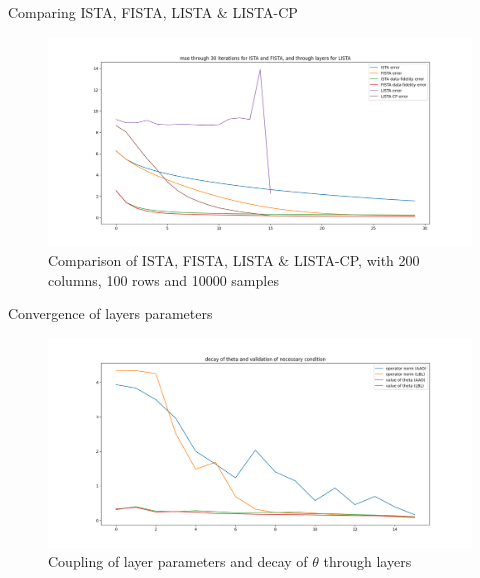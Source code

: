 \documentclass{beamer}
\begin{document}
\begin{frame}{Comparing ISTA, FISTA, LISTA \& LISTA-CP }
    \begin{figure}
        \centering
        \includegraphics[width=\textwidth]{test_lista_fista_c200_r100_s10000.png}
        \caption{Comparison of ISTA, FISTA, LISTA \& LISTA-CP, with 200 columns, 100 rows and 10000 samples}
        \label{fig:my_label}
    \end{figure}
\end{frame}
\begin{frame}{Convergence of layers parameters}
    \begin{figure}
        \centering
        \includegraphics[width=\textwidth]{decay_theta_slow_last_OF.png}
        \caption{Coupling of layer parameters and decay of $\theta$ through layers}
        \label{fig:my_label}
    \end{figure}
\end{frame}
\end{document}
